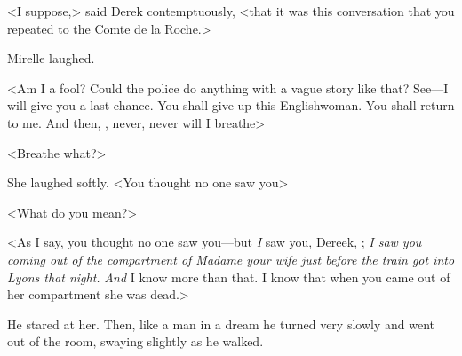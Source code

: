 <I suppose,> said Derek contemptuously, <that it was this conversation that you repeated to the Comte de la Roche.>

Mirelle laughed.

<Am I a fool? Could the police do anything with a vague story like that? See—I will give you a last chance. You shall give up this Englishwoman. You shall return to me. And then, , never, never will I breathe\longdash>

<Breathe what?>

She laughed softly. <You thought no one saw you\longdash>

<What do you mean?>

<As I say, you thought no one saw you—but \emph{I} saw you, Dereek, ; \emph{I saw you coming out of the compartment of Madame your wife just before the train got into Lyons that night.} \emph{And} I know more than that. I know that when you came out of her compartment she was dead.>

He stared at her. Then, like a man in a dream he turned very slowly and went out of the room, swaying slightly as he walked.